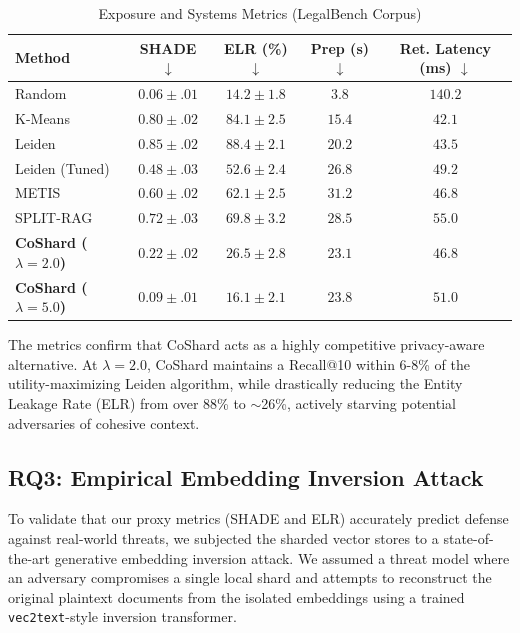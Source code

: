 \begin{table}[htbp]
\centering
\caption{Exposure and Systems Metrics (LegalBench Corpus)}
\label{tab:ml_metrics_legal_privacy}
\begin{tabular}{l | c c | c c}
\hline
\textbf{Method} & \textbf{SHADE} $\downarrow$ & \textbf{ELR (\%)} $\downarrow$ & \textbf{Prep (s)} $\downarrow$ & \textbf{Ret. Latency (ms)} $\downarrow$ \\
\hline
Random & $\mathbf{0.06 \pm .01}$ & $\mathbf{14.2 \pm 1.8}$ & $\mathbf{3.8}$ & $140.2$ \\
K-Means & $0.80 \pm .02$ & $84.1 \pm 2.5$ & $15.4$ & $\mathbf{42.1}$ \\
Leiden & $0.85 \pm .02$ & $88.4 \pm 2.1$ & $20.2$ & $43.5$ \\
Leiden (Tuned) & $0.48 \pm .03$ & $52.6 \pm 2.4$ & $26.8$ & $49.2$ \\
METIS & $0.60 \pm .02$ & $62.1 \pm 2.5$ & $31.2$ & $46.8$ \\
SPLIT-RAG & $0.72 \pm .03$ & $69.8 \pm 3.2$ & $28.5$ & $55.0$ \\
\hline
\textbf{CoShard ($\lambda=2.0$)} & $0.22 \pm .02$ & $26.5 \pm 2.8$ & $23.1$ & $46.8$ \\
\textbf{CoShard ($\lambda=5.0$)} & $0.09 \pm .01$ & $16.1 \pm 2.1$ & $23.8$ & $51.0$ \\
\hline
\end{tabular}
\end{table}

The metrics confirm that CoShard acts as a highly competitive privacy-aware alternative. At $\lambda=2.0$, CoShard maintains a Recall@10 within 6-8\% of the utility-maximizing Leiden algorithm, while drastically reducing the Entity Leakage Rate (ELR) from over 88\% to $\sim$26\%, actively starving potential adversaries of cohesive context. 

\subsection{RQ3: Empirical Embedding Inversion Attack}
\label{sec:empirical_attack}
To validate that our proxy metrics (SHADE and ELR) accurately predict defense against real-world threats, we subjected the sharded vector stores to a state-of-the-art generative embedding inversion attack. We assumed a threat model where an adversary compromises a single local shard and attempts to reconstruct the original plaintext documents from the isolated embeddings using a trained \texttt{vec2text}-style inversion transformer.

